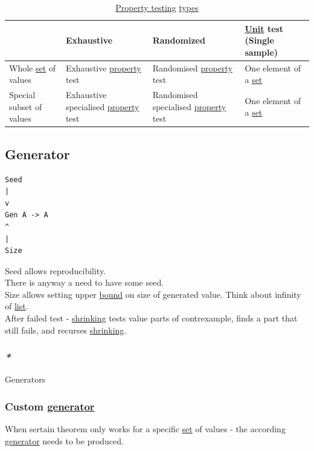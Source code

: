 \documentclass[a4paper,14pt,oneside]{book}
\begin{document}
\begin{table}[htbp]
\caption{\label{tab--property-testing-type}\hyperref[orgefdfbf0]{Property testing} \hyperref[orgff9cdcc]{types}}
\centering
\begin{tabular}{llll}
\hline
 & Exhaustive & Randomized & \hyperref[org2f67cc5]{Unit} test (Single sample)\\
\hline
Whole \hyperref[org74bf657]{set} of values & Exhaustive \hyperref[orgfdc5558]{property} test & Randomised \hyperref[orgfdc5558]{property} test & One element of a \hyperref[org74bf657]{set}\\
Special subset of values & Exhaustive specialised \hyperref[orgfdc5558]{property} test & Randomised specialised \hyperref[orgfdc5558]{property} test & One element of a \hyperref[org74bf657]{set}\\
\hline
\end{tabular}
\end{table}

\subsection{\label{orgd1703d9}Generator}
\label{sec:org7d5d233}
\begin{verbatim}
Seed
|
v
Gen A -> A
^
|
Size
\end{verbatim}

Seed allows reproducibility.\\
There is anyway a need to have some seed.\\
Size allows setting upper \hyperref[org6c4e380]{bound} on size of generated value. Think about infinity of \hyperref[orgcb490bc]{list}.\\

After failed test - \hyperref[org3016036]{shrinking} tests value parts of contrexample, finds a part that still fails, and recurses \hyperref[org3016036]{shrinking}.\\

\subsubsection{\emph{*}}
\label{sec:org7dce113}

\label{org0a3fa67}Generators\\

\subsubsection{Custom \hyperref[orgd1703d9]{generator}}
\label{sec:org62065a4}
When sertain theorem only works for a specific \hyperref[org74bf657]{set} of values - the according \hyperref[orgd1703d9]{generator} needs to be produced.\\
\end{document}
